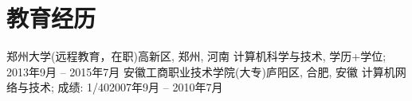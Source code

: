 \section{\textbf{教育经历}}
  \resumeSubHeadingListStart
    \resumeSubheading
      {郑州大学(远程教育，在职)}{高新区, 郑州, 河南}
      {计算机科学与技术, 学历+学位; }{2013年9月 -- 2015年7月}
    \resumeSubheading
      {安徽工商职业技术学院(大专)}{庐阳区, 合肥, 安徽}
      {计算机网络与技术; 成绩: 1/40}{2007年9月 -- 2010年7月}
  \resumeSubHeadingListEnd
